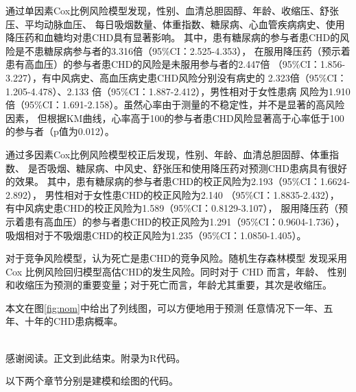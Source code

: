 \documentclass[lang=cn,11pt,a4paper,cite=super,AutoFakeBold]{elegantpaper}
\begin{document}
通过单因素Cox比例风险模型发现，性别、血清总胆固醇、年龄、收缩压、舒张压、平均动脉血压、
每日吸烟数量、体重指数、糖尿病、心血管疾病病史、使用降压药和血糖均对患CHD具有显著影响。
其中，患有糖尿病的参与者患CHD的风险是不患糖尿病参与者的3.316倍（95\%CI：2.525-4.353），
在服用降压药（预示着患有高血压）的参与者患CHD的风险是未服用参与者的2.447倍
（95\%CI：1.856-3.227），有中风病史、高血压病史患CHD风险分别没有病史的
2.323倍（95\%CI：1.205-4.478）、2.133 倍（95\%CI：1.887-2.412），男性相对于女性患病
风险为1.910 倍（95\%CI：1.691-2.158）。虽然心率由于测量的不稳定性，并不是显著的高风险因素，
但根据KM曲线，心率高于100的参与者患CHD风险显著高于心率低于100的参与者（p值为0.012）。

通过多因素Cox比例风险模型校正后发现，性别、年龄、血清总胆固醇、体重指数、
是否吸烟、糖尿病、中风史、舒张压和使用降压药对预测CHD患病具有很好的效果。
其中，患有糖尿病的参与者患CHD的校正风险为2.193（95\%CI：1.6624-2.892），
男性相对于女性患CHD的校正风险为2.140 （95\%CI：1.8835-2.432），
有中风病史患CHD的校正风险为1.589（95\%CI：0.8129-3.107），
服用降压药（预示着患有高血压）的参与者患CHD的校正风险为1.291（95\%CI：0.9604-1.736），
吸烟相对于不吸烟患CHD的校正风险为1.235（95\%CI：1.0850-1.405）。

对于竞争风险模型，认为死亡是患CHD的竞争风险。随机生存森林模型
发现采用Cox 比例风险回归模型高估CHD的发生风险。同时对于 CHD 而言，年龄、
性别和收缩压为预测的重要变量；对于死亡而言，年龄尤其重要，其次是收缩压。

本文在图\ref{fig:nom}中给出了列线图，可以方便地用于预测
任意情况下一年、五年、十年的CHD患病概率。

~\\

感谢阅读。正文到此结束。附录为R代码。

\newpage
\nocite{*}


\newpage
\appendix
\appendixpage
\addappheadtotoc

以下两个章节分别是建模和绘图的代码。
\end{document}
